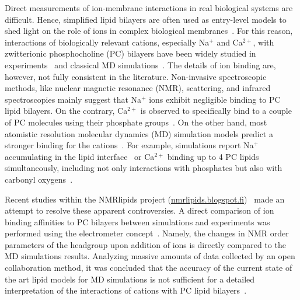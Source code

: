 \documentclass[aip,jcp,twocolumn]{revtex4}
\begin{document}
Direct measurements of ion-membrane interactions in real biological systems are difficult. 
Hence, simplified lipid bilayers are often used as entry-level models to shed light on the role of ions in complex biological membranes~\cite{scherer87,seelig90,cevc90}. 
For this reason, interactions of biologically relevant cations, especially Na$^+$ and Ca$^{2+}$, with zwitterionic phosphocholine (PC) bilayers have been widely studied in experiments~\cite{akutsu81, altenbach84, seelig90, cevc90, tocanne90, binder02, pabst07, uhrikova08} and classical MD simulations~\cite{bockmann03, bockmann04, Berkowitz12, melcrova16, javanainen17}. The details of ion binding are, however, not fully consistent in the literature. Non-invasive spectroscopic methods, like nuclear magnetic resonance (NMR), scattering, and infrared spectroscopies mainly suggest that Na$^+$ ions exhibit negligible binding to PC lipid bilayers. On the contrary, Ca$^{2+}$ is observed to specifically bind to a couple of PC molecules using their phosphate groups~\cite{hauser76, hauser78, herbette84, akutsu81, altenbach84, binder02, pabst07, uhrikova08}. On the other hand, most atomistic resolution molecular dynamics (MD) simulation models predict a stronger binding for the cations~\cite{catte16}. For example, simulations report Na$^+$ accumulating in the lipid interface~\cite{bockmann03} or Ca$^{2+}$ binding up to 4 PC lipids simultaneously, including not only interactions with phosphates but also with carbonyl oxygens~\cite{bockmann04, melcrova16, javanainen17}.

Recent studies within the NMRlipids project (\url{nmrlipids.blogspot.fi})~\cite{catte16} made an attempt to resolve these apparent controversies. A direct comparison of ion binding affinities to PC bilayers between simulations and experiments was performed using the electrometer concept~\cite{seelig87}. Namely, the changes in NMR order parameters of the headgroup upon addition of ions is directly compared to the MD simulations results. 
Analyzing massive amounts of data collected by an open collaboration method, 
it was concluded that the accuracy of the current state of the art lipid models for MD simulations is not sufficient for a detailed interpretation of the interactions of cations with PC lipid bilayers~\cite{catte16}.



\end{document}
